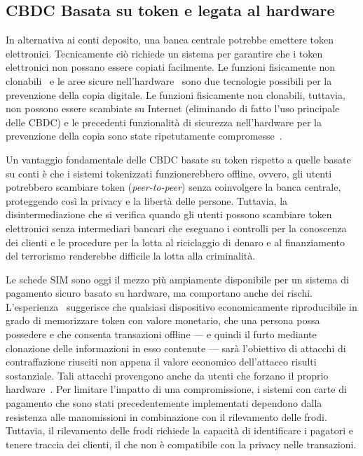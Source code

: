 \documentclass{article}
\begin{document}


\subsection{CBDC Basata su token e legata al hardware}
\label{cbdc-basata-su-token-e-legata-al-hardware}

In alternativa ai conti deposito, una banca centrale potrebbe emettere 
token elettronici. Tecnicamente ciò richiede un sistema per garantire che 
i token elettronici non possano essere copiati facilmente. Le funzioni 
fisicamente non clonabili~\cite[vedi][]{Katzenbeisser} e le aree 
sicure nell'hardware~\cite[vedi][]{Alves,Pinto} sono due tecnologie 
possibili per la prevenzione della copia digitale. Le funzioni 
fisicamente non clonabili, tuttavia, non possono essere scambiate su 
Internet (eliminando di fatto l'uso principale delle CBDC) e le precedenti 
funzionalità di sicurezza nell'hardware per la prevenzione della copia 
sono state ripetutamente compromesse~\cite[si veda, ad esempio,][]{Wojtczuk,Johnston,Lapid}.

Un vantaggio fondamentale delle CBDC basate su token rispetto a quelle 
basate su conti è che i sistemi tokenizzati funzionerebbero offline, 
ovvero, gli utenti potrebbero scambiare token (\textit{peer-to-peer}) 
senza coinvolgere la banca centrale, proteggendo così la privacy e la 
libertà delle persone. Tuttavia, la disintermediazione che si verifica 
quando gli utenti possono scambiare token elettronici senza 
intermediari bancari che eseguano i controlli per la conoscenza dei 
clienti e le procedure per la lotta al riciclaggio di denaro e al 
finanziamento del terrorismo renderebbe difficile la lotta alla 
criminalità.

Le schede SIM sono oggi il mezzo più ampiamente disponibile per un 
sistema di pagamento sicuro basato su hardware, ma comportano anche 
dei rischi. L'esperienza~\cite[si veda, ad esempio,][]{Soukup,Garcia,Kasper,CCC} 
suggerisce che qualsiasi dispositivo economicamente riproducibile in grado 
di memorizzare token con valore monetario, che una persona possa possedere 
e che consenta transazioni offline --- e quindi il furto mediante 
clonazione delle informazioni in esso contenute --- sarà l'obiettivo di 
attacchi di contraffazione riusciti non appena il valore economico 
dell'attacco risulti sostanziale. Tali attacchi provengono anche da 
utenti che forzano il proprio hardware~\cite[vedi][]{Allen}. Per 
limitare l'impatto di una compromissione, i sistemi con carte di pagamento 
che sono stati precedentemente implementati dependono dalla resistenza 
alle manomissioni in combinazione con il rilevamento delle frodi. 
Tuttavia, il rilevamento delle frodi richiede la capacità di identificare 
i pagatori e tenere traccia dei clienti, il che non è compatibile con la 
privacy nelle transazioni.
\end{document}
